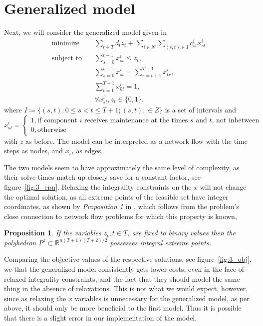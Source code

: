 \documentclass{article}
\newtheorem{prop}{Proposition}
\begin{document}
\section{Generalized model}
Next, we will consider the generalized model given in
\autocite{gustavsson14}
\begin{equation*}
	\begin{aligned}
        \text{minimize} \quad & \sum_{t \in T} d_t z_t + \sum_{i \in N} \sum_{(s,t) \in I} c^i_{st} x^i_{st}. \\
        \text{subject to} \quad & \sum^{t-1}_{s=0} x^i_{st} \le z_t, \\
        & \sum^{t-1}_{s=0} x^i_{st} = \sum^{T+1}_{r=t+1} x^i_{tr}, \\
        & \sum^{T+1}_{t=1} x^i_{0t} = 1, \\
        & \forall x^i_{st}, z_t \in \{0,1\}.
    \end{aligned}
\end{equation*}
where
$I \coloneqq \{(s,t): 0 \le s < t \le T + 1; (s,t), \in Z\}$
is a set of intervals and
$$ x^i_{st} = 
\begin{cases} 
 1, \text{if component $i$ receives maintenance at the times $s$ and $t$, not inbetween} \\
 0, \text{otherwise}
\end{cases} $$
with $z$ as before.
The model can be interpreted as a network flow with the
time steps as nodes, and $x_{st}$ as edges.

The two models seem to have approximately the same level of complexity,
as their solve times match up closely save for a constant factor,
see figure~\ref{fig:3_cpu}.
Relaxing the integrality constraints on the $x$ will not change the optimal solution,
as all extreme points of the feasible set have integer coordinates,
as shown by \textit{Proposition 1} in \autocite{gustavsson14}, which follows from the problem's close connection to network flow problems for which this property is known,
\begin{prop}
If the variables $z_t, t \in T$, are fixed to binary values then the polyhedron $P^z \subset \mathbb{R}^{n(T+1)(T+2)/2}$ possesses integral extreme points.
\end{prop}
Comparing the objective values of the respective solutions,
see figure~\ref{fig:3_obj},
we that the generalized model consistently gets lower costs,
even in the face of relaxed integrality constraints,
and the fact that they should model the same thing
in the absence of relaxations.
This is not what we would expect, however,
since as relaxing the $x$ variables is unnecessary for the generalized model,
as per above,
it should only be more beneficial to the first model.
Thus it is possible that there is a slight error in our implementation of the model.
\end{document}
